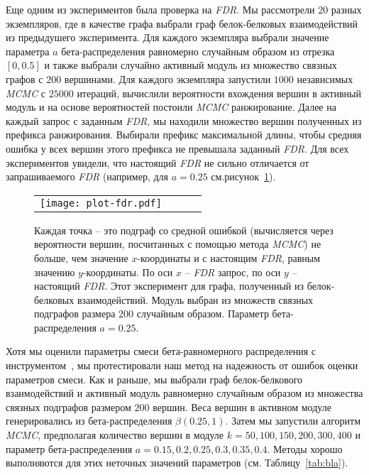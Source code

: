 Еще одним из экспериментов была проверка на \emph{FDR}.  Мы рассмотрели $20$
разных экземпляров, где в качестве графа выбрали граф белок-белковых
взаимодействий из предыдушего эксперимента.  Для каждого экземпляра выбрали
значение параметра $a$ бета-распределения равномерно случайным образом из
отрезка $[0, 0.5]$ и также выбрали случайно активный модуль из множество
связных графов с $200$ вершинами.  Для каждого экземпляра запустили $1000$
независимых \emph{MCMC} с $25000$ итераций, вычислили вероятности вхождения
вершин в активный модуль и на основе вероятностей постоили \emph{MCMC}
ранжирование.  Далее на каждый запрос с заданным \emph{FDR}, мы находили
множество вершин полученных из префикса ранжирования.  Выбирали префикс
максимальной длины, чтобы средняя ошибка у всех вершин этого префикса не
превышала заданный \emph{FDR}.  Для всех экспериментов увидели, что настоящий
\emph{FDR} не сильно отличается от запрашиваемого \emph{FDR} (например, для $a
= 0.25$ см.рисунок~\ref{fig:fdr}).

\begin{figure}
    \centering
    \begin{tabular}{@{}cccc@{}}
        \texttt{[image: plot-fdr.pdf]}
    \end{tabular}
    \caption{
        Каждая точка -- это подграф со средной ошибкой (вычисляется через
        вероятности вершин, посчитанных с помощью метода \emph{MCMC}) не
        больше, чем значение $x$-координаты и с настоящим \emph{FDR}, равным
        значению $y$-координаты.  По оси $x$ -- \emph{FDR} запрос, по оси $y$
        -- настоящий \emph{FDR}.  Этот эксперимент для графа, полученный из
        белок-белковых взаимодействий.  Модуль выбран из множеств связных
        подграфов размера $200$ случайным образом. Параметр бета-распределения
        $a=0.25$.
    }%
    \label{fig:fdr}%
\end{figure}

Хотя мы оценили параметры смеси бета-равномерного распределения
с инструментом~\cite{Beisser2010}, мы протестировали наш метод на надежность от
ошибок оценки параметров смеси.  Как и раньше, мы выбрали граф белок-белкового
взаимодействий и активный модуль равномерно случайным образом из множества
связных подграфов размером $200$ вершин.  Веса вершин в активном модуле
генерировались из бета-распределения $\beta(0.25, 1)$.  Затем мы запустили
алгоритм \emph{MCMC}, предполагая количество вершин в модуле $k = 50, 100, 150,
200, 300, 400$ и параметр бета-распределения $a = 0.15, 0.2, 0.25, 0.3,
0.35, 0.4$.  Методы хорошо выполняются для этих неточных значений параметров
  (см. Таблицу~\ref{tab:bla}).

